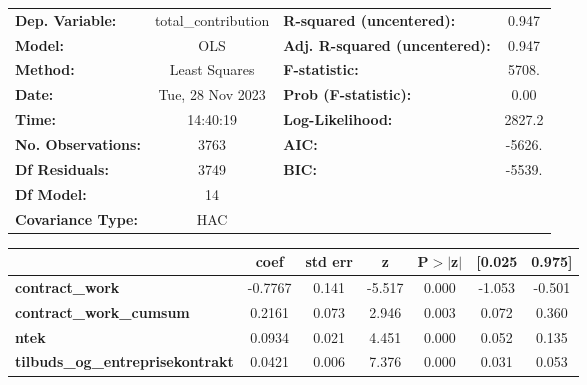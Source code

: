 \begin{center}
\begin{tabular}{lclc}
\toprule
\textbf{Dep. Variable:}                     & total\_contribution & \textbf{  R-squared (uncentered):}      &     0.947   \\
\textbf{Model:}                             &         OLS         & \textbf{  Adj. R-squared (uncentered):} &     0.947   \\
\textbf{Method:}                            &    Least Squares    & \textbf{  F-statistic:       }          &     5708.   \\
\textbf{Date:}                              &   Tue, 28 Nov 2023  & \textbf{  Prob (F-statistic):}          &     0.00    \\
\textbf{Time:}                              &       14:40:19      & \textbf{  Log-Likelihood:    }          &    2827.2   \\
\textbf{No. Observations:}                  &          3763       & \textbf{  AIC:               }          &    -5626.   \\
\textbf{Df Residuals:}                      &          3749       & \textbf{  BIC:               }          &    -5539.   \\
\textbf{Df Model:}                          &            14       & \textbf{                     }          &             \\
\textbf{Covariance Type:}                   &         HAC         & \textbf{                     }          &             \\
\bottomrule
\end{tabular}
\begin{tabular}{lcccccc}
                                            & \textbf{coef} & \textbf{std err} & \textbf{z} & \textbf{P$> |$z$|$} & \textbf{[0.025} & \textbf{0.975]}  \\
\midrule
\textbf{contract\_work}                     &      -0.7767  &        0.141     &    -5.517  &         0.000        &       -1.053    &       -0.501     \\
\textbf{contract\_work\_cumsum}             &       0.2161  &        0.073     &     2.946  &         0.003        &        0.072    &        0.360     \\
\textbf{ntek}                               &       0.0934  &        0.021     &     4.451  &         0.000        &        0.052    &        0.135     \\
\textbf{tilbuds\_og\_entreprisekontrakt}    &       0.0421  &        0.006     &     7.376  &         0.000        &        0.031    &        0.053     \\

\end{tabular}
\end{center}
